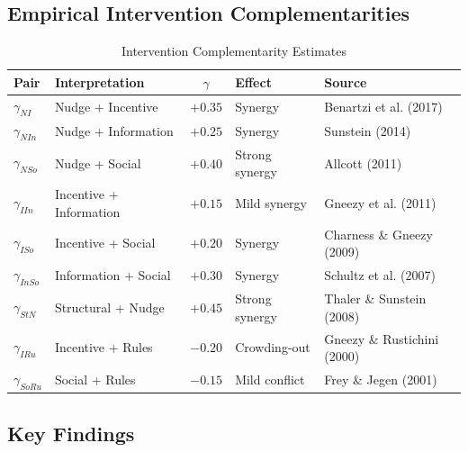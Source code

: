 \subsection{Empirical Intervention Complementarities}

\begin{table}[h]
\centering
\caption{Intervention Complementarity Estimates}
\label{tab:int-gamma}
\renewcommand{\arraystretch}{1.2}
\small
\begin{tabular}{@{}llcll@{}}
\toprule
\textbf{Pair} & \textbf{Interpretation} & \textbf{$\gamma$} & \textbf{Effect} & \textbf{Source} \\
\midrule
$\gamma_{NI}$ & Nudge + Incentive & $+0.35$ & Synergy & Benartzi et al. (2017) \\
$\gamma_{NIn}$ & Nudge + Information & $+0.25$ & Synergy & Sunstein (2014) \\
$\gamma_{NSo}$ & Nudge + Social & $+0.40$ & Strong synergy & Allcott (2011) \\
$\gamma_{IIn}$ & Incentive + Information & $+0.15$ & Mild synergy & Gneezy et al. (2011) \\
$\gamma_{ISo}$ & Incentive + Social & $+0.20$ & Synergy & Charness \& Gneezy (2009) \\
$\gamma_{InSo}$ & Information + Social & $+0.30$ & Synergy & Schultz et al. (2007) \\
$\gamma_{StN}$ & Structural + Nudge & $+0.45$ & Strong synergy & Thaler \& Sunstein (2008) \\
$\gamma_{IRu}$ & Incentive + Rules & $-0.20$ & Crowding-out & Gneezy \& Rustichini (2000) \\
$\gamma_{SoRu}$ & Social + Rules & $-0.15$ & Mild conflict & Frey \& Jegen (2001) \\
\bottomrule
\end{tabular}
\end{table}

\subsection{Key Findings}

